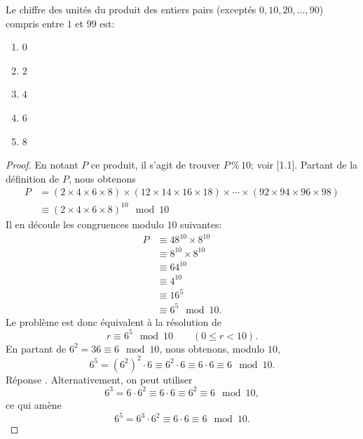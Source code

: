 %
Le chiffre des unités du produit des entiers pairs (exceptés $0, 10, 20,
\ldots, 90$) compris entre $1$ et $99$ est:
\begin{enumerate}
  \item $0$
  \item $2$
  \item $4$
  \item $6$
  \item $8$
\end{enumerate}
%
%
\begin{proof}En notant $P$ ce produit, il s'agit de trouver $P \, \% \, 10$; voir [1.1]. Partant de %
la définition de $P$, nous obtenons
%
\begin{align}
P & =   (2 \times 4 \times 6 \times 8) \times (12 \times 14 \times 16 \times 18)\times \cdots \times %
(92 \times 94 \times 96 \times 98) \\
&\equiv (2 \times 4 \times 6 \times 8)^{10} \mod 10
\end{align}
%
Il en découle les congruences modulo $10$ suivantes:
\begin{align}
P &\equiv 48^{10} \times 8^{10}\\
&\equiv 8^{10} \times 8^{10}\\
&\equiv 64^{10}\\
&\equiv 4^{10}\\
&\equiv 16^{5}\\
&\equiv 6^{5} \mod 10.
\end{align}
%
Le problème est donc équivalent à la résolution de 
%
\begin{equation}
r \equiv 6^{5} \mod 10 \qquad (0 \leq r < 10).
\end{equation}
%
En partant de $6^2 = 36 \equiv 6 \mod 10$, nous obtenons, modulo $10$, 
%
\begin{equation}
  6^5 = (6^2)^2 \cdot 6 \equiv 6^2 \cdot 6 \equiv 6 \cdot 6 \equiv 6 \mod 10.
  \end{equation}
%
Réponse . Alternativement, on peut utiliser 
\begin{equation}
  6^3= 6 \cdot 6^2 \equiv 6 \cdot 6 \equiv 6^2 \equiv 6 \mod 10, 
\end{equation}
%
ce qui amène 
%
\begin{equation}
6^5 = 6^3 \cdot 6^2 \equiv 6 \cdot 6 \equiv 6 \mod 10.
\end{equation}
%
\end{proof}